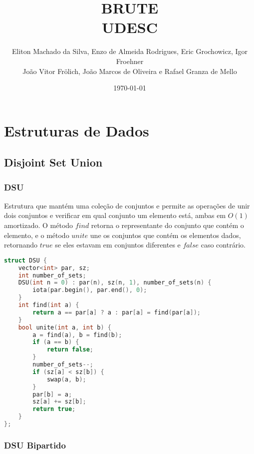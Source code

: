 \documentclass[11pt, a4paper, oneside]{book}
\title{BRUTE \\ UDESC}
\author{Eliton Machado da Silva, Enzo de Almeida Rodrigues, Eric Grochowicz, Igor Froehner\\ João Vitor Frölich, João Marcos de Oliveira e Rafael Granza de Mello}
\begin{document}
\date{\today}
\maketitle

\renewcommand{\contentsname}{Índice} %

\tableofcontents
\newpage

%
%
%
%

\chapter{Estruturas de Dados}

\section{Disjoint Set Union}
\subsection{DSU}


Estrutura que mantém uma coleção de conjuntos e permite as operações de unir dois conjuntos e verificar em qual conjunto um elemento está, ambas em $O(1)$ amortizado. O método $find$ retorna o representante do conjunto que contém o elemento, e o método $unite$ une os conjuntos que contém os elementos dados, retornando $true$ se eles estavam em conjuntos diferentes e $false$ caso contrário.

\hfill

\begin{multicols}{2}
\begin{lstlisting}[language=C++]
struct DSU {
    vector<int> par, sz;
    int number_of_sets;
    DSU(int n = 0) : par(n), sz(n, 1), number_of_sets(n) {
        iota(par.begin(), par.end(), 0);
    }
    int find(int a) {
        return a == par[a] ? a : par[a] = find(par[a]);
    }
    bool unite(int a, int b) {
        a = find(a), b = find(b);
        if (a == b) {
            return false;
        }
        number_of_sets--;
        if (sz[a] < sz[b]) {
            swap(a, b);
        }
        par[b] = a;
        sz[a] += sz[b];
        return true;
    }
};
\end{lstlisting}
\end{multicols}

\hfill

\subsection{DSU Bipartido}
\end{document}
